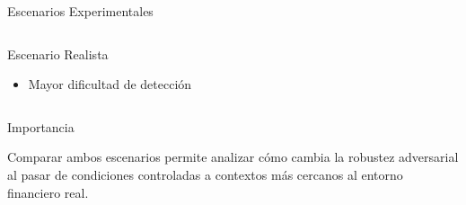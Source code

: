 \documentclass[aspectratio=169, 8pt]{beamer}
\begin{document}
\begin{frame}{Escenarios Experimentales}
\begin{columns}
\begin{block}{Escenario Realista}
\begin{itemize}
\item Mayor dificultad de detección

\end{itemize}

\end{block}

\end{columns}

\vspace{0.25cm}

\begin{alertblock}{Importancia}

Comparar ambos escenarios permite analizar
cómo cambia la robustez adversarial al pasar
de condiciones controladas a contextos más cercanos
al entorno financiero real.

\end{alertblock}

\end{frame}
\end{document}
